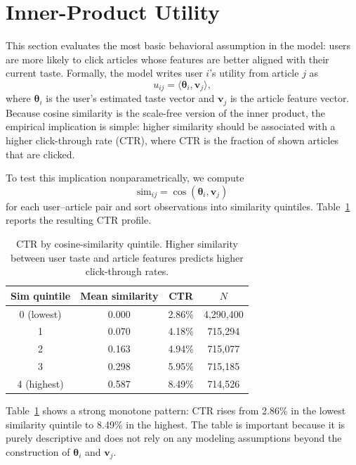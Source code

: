 \documentclass[11pt]{article}
\begin{document}
\section{Inner-Product Utility}
\label{sec:utility}

This section evaluates the most basic behavioral assumption in the model: users are more likely to click articles whose features are better aligned with their current taste. Formally, the model writes user $i$'s utility from article $j$ as
\[
u_{ij} = \langle \boldsymbol{\theta}_i,\mathbf{v}_j\rangle,
\]
where $\boldsymbol{\theta}_i$ is the user's estimated taste vector and $\mathbf{v}_j$ is the article feature vector. Because cosine similarity is the scale-free version of the inner product, the empirical implication is simple: higher similarity should be associated with a higher click-through rate (CTR), where CTR is the fraction of shown articles that are clicked.

To test this implication nonparametrically, we compute
\[
\text{sim}_{ij} = \cos(\boldsymbol{\theta}_i,\mathbf{v}_j)
\]
for each user--article pair and sort observations into similarity quintiles. Table~\ref{tab:sim_quintile} reports the resulting CTR profile.

\begin{table}[ht]
\centering
\caption{CTR by cosine-similarity quintile. Higher similarity between user taste and article features predicts higher click-through rates.}
\label{tab:sim_quintile}
\begin{tabular}{cccc}
\toprule
Sim quintile & Mean similarity & CTR & $N$ \\
\midrule
0 (lowest) & 0.000 & 2.86\% & 4,290,400 \\
1 & 0.070 & 4.18\% & 715,294 \\
2 & 0.163 & 4.94\% & 715,077 \\
3 & 0.298 & 5.95\% & 715,185 \\
4 (highest) & 0.587 & 8.49\% & 714,526 \\
\bottomrule
\end{tabular}
\end{table}
\FloatBarrier

Table~\ref{tab:sim_quintile} shows a strong monotone pattern: CTR rises from 2.86\% in the lowest similarity quintile to 8.49\% in the highest. The table is important because it is purely descriptive and does not rely on any modeling assumptions beyond the construction of $\boldsymbol{\theta}_i$ and $\mathbf{v}_j$.
\end{document}
